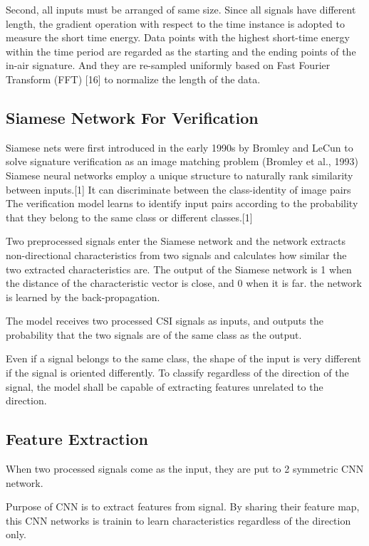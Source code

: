 \documentclass[runningheads]{llncs}
\begin{document}
Second, all inputs must be arranged of same size.
Since all signals have different length, the gradient operation with respect to the time instance is adopted to measure the short time energy. 
Data points with the highest short-time energy within the time period are regarded as the starting and the ending points of the in-air signature.
And they are re-sampled uniformly based on Fast Fourier Transform (FFT) [16] to normalize the length of the data. 


\subsection{Siamese Network For Verification}

Siamese nets were first introduced in the early 1990s by Bromley and LeCun to solve signature verification as an image matching problem (Bromley et al., 1993)
Siamese neural networks employ a unique structure to naturally rank similarity between inputs.[1] 
It can discriminate between the class-identity of image pairs
The verification model learns to identify input pairs according to the probability that they belong to the same class or different classes.[1]

Two preprocessed signals enter the Siamese network and the network 
extracts non-directional characteristics from two signals and calculates how similar the two extracted characteristics are.
 The output of the Siamese network is 1 when the distance of the characteristic vector is close, and 0 when it is far.
the network is learned by the back-propagation.

The model receives two processed CSI signals as inputs, and outputs the probability that the two signals are of the same class as the output.

Even if a signal belongs to the same class, the shape of the input is very different if the signal is oriented differently.
To classify regardless of the direction of the signal, the model shall be capable of extracting features unrelated to the direction.

\subsection{Feature Extraction}
When two processed signals come as the input, they are put to 2 symmetric CNN network.

Purpose of CNN is to extract features from signal.
By sharing their feature map, this CNN networks is trainin to learn characteristics regardless of the direction only.
\end{document}
